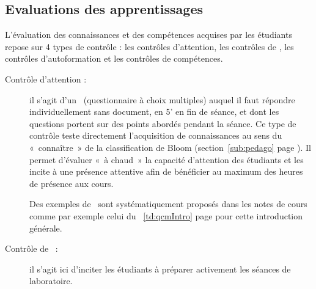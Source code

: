 \subsection{Evaluations des apprentissages}\label{sub:evaluation}
L'évaluation des connaissances et des compétences acquises par les étudiants
repose sur 4 types de contrôle : les contrôles d'attention, les contrôles de \tdir, 
les contrôles d'autoformation et les contrôles de compétences.
\begin{description}
\item[Contrôle d'attention :] \mbox{}
	il s'agit d'un \qcm\ (questionnaire à choix multiples) 
	auquel il faut répondre individuellement
	sans document, en 5' en fin de séance, et dont les questions portent 
	sur des points abordés pendant la séance. Ce type de contrôle teste directement
	l'acquisition de connaissances au sens du «~connaître~» de la classification de
	Bloom (section~\ref{sub:pedago} page \pageref{sub:pedago}).
	Il permet d'évaluer «~à chaud~» la capacité d'attention des étudiants et les incite 
	à une présence attentive afin de bénéficier au maximum des heures de présence 
	aux cours. 	
	
	Des exemples de \qcm\ sont systématiquement proposés dans les notes de cours
	comme par exemple celui du \tdir\ \ref{td:qcmIntro} page
	\pageref{td:qcmIntro} pour cette introduction générale.
\item[Contrôle de \tdir\ :]\mbox{} 
	il s'agit ici d'inciter les étudiants à préparer
	activement les séances de laboratoire. 
\end{description}
